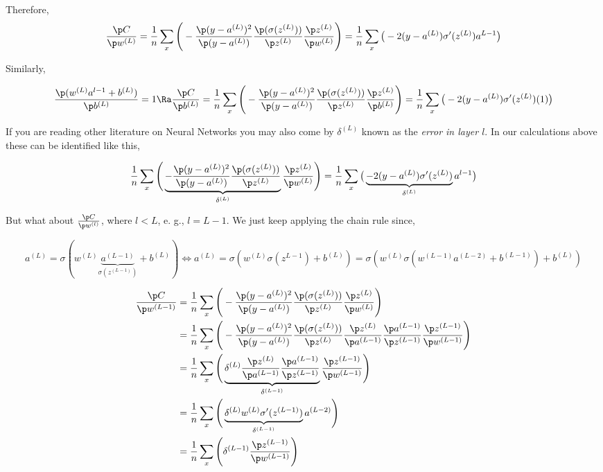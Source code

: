 \documentclass{homework}
\begin{document}
Therefore,
\[
  \frac{\p C}{\p w^{(L)}} =
  \frac{1}{n} \sum_x \Bigg( -\frac{\p (y-a^{(L)})^2}{\p (y-a^{(L)})} \frac{\p (\sigma(z^{(L)}))}{\p z^{(L)}} \frac{\p z^{(L)}}{\p w^{(L)}} \Bigg)
  = \frac{1}{n} \sum_x \big(-2(y-a^{(L)})\sigma'(z^{(L)})a^{L-1} \big)
\]

Similarly,

\[
  \frac{\p (w^{(L)} a^{l-1} + b^{(L)})}{\p b^{(L)}} = 1 \Ra
  \frac{\p C}{\p b^{(L)}} =
  \frac{1}{n} \sum_x \Bigg( -\frac{\p (y-a^{(L)})^2}{\p (y-a^{(L)})} \frac{\p (\sigma(z^{(L)}))}{\p z^{(L)}} \frac{\p z^{(L)}}{\p b^{(L)}} \Bigg)
  = \frac{1}{n} \sum_x \big(-2(y-a^{(L)})\sigma'(z^{(L)})(1)\big)
\]

If you are reading other literature on Neural Networks you may also come by  $\delta^{(L)}$ known as the \textit{error in layer $l$}. In our calculations above these can be identified like this,

\[
  \frac{1}{n} \sum_x \Bigg( \underbrace{-\frac{\p (y-a^{(L)})^2}{\p (y-a^{(L)})} \frac{\p (\sigma(z^{(L)}))}{\p z^{(L)}}}_{\delta^{(L)}} \frac{\p z^{(L)}}{\p w^{(L)}} \Bigg)
  =
  \frac{1}{n} \sum_x \big(\underbrace{-2(y-a^{(L)})\sigma'(z^{(L)})}_{\delta^{(L)}}a^{l-1}\big)
\]

But what about $\frac{\p C}{\p w^{(l)}}$, where $l < L$, e. g., $l = L-1$. We just keep applying the chain rule since,

\[
  a^{(L)} = \sigma(w^{(L)}\underbrace{a^{(L-1)}}_{\sigma(z^{(L-1)})}+b^{(L)})\iff a^{(L)} = \sigma(w^{(L)}\sigma(z^{L-1})+b^{(L)})
  =\sigma(w^{(L)}\sigma(w^{(L-1)}a^{(L-2)} + b^{(L-1)})+b^{(L)})
\]

\begin{align*}
  \frac{\p C}{\p w^{(L-1)}}
  & = \frac{1}{n} \sum_x \Bigg( -\frac{\p (y-a^{(L)})^2}{\p (y-a^{(L)})} \frac{\p (\sigma(z^{(L)}))}{\p z^{(L)}} \frac{\p z^{(L)}}{\p w^{(L)}} \Bigg) \\
  & = \frac{1}{n} \sum_x \Bigg( -\frac{\p (y-a^{(L)})^2}{\p (y-a^{(L)})} \frac{\p (\sigma(z^{(L)}))}{\p z^{(L)}} \frac{\p z^{(L)}}{\p a^{(L-1)}} \frac{\p a^{(L-1)}}{\p z^{(L-1)}}\frac{\p z^{(L-1)}}{\p w^{(L-1)}} \Bigg) \\
  & = \frac{1}{n} \sum_x \Bigg( \underbrace{\delta^{(L)} \frac{\p z^{(L)}}{\p a^{(L-1)}} \frac{\p a^{(L-1)}}{\p z^{(L-1)}}}_{\delta^{(L-1)}}\frac{\p z^{(L-1)}}{\p w^{(L-1)}} \Bigg) \\
  & = \frac{1}{n} \sum_x \Bigg( \underbrace{\delta^{(L)} w^{(L)} \sigma'(z^{(L-1)})}_{\delta^{(L-1)}}a^{(L-2)} \Bigg) \\
  & = \frac{1}{n} \sum_x \Bigg( \delta^{(L-1)}\frac{\p z^{(L-1)}}{\p w^{(L-1)}} \Bigg) \\
\end{align*}
\end{document}
